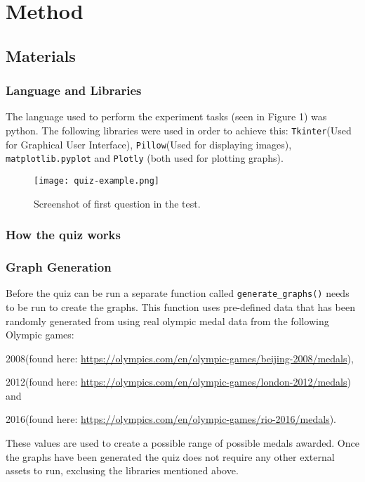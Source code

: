 \section{Method}


\subsection{Materials}
\subsubsection{Language and Libraries}
The language used to perform the experiment tasks (seen in Figure 1) was python. The following libraries were used in order to achieve this:
\verb|Tkinter|(Used for Graphical User Interface), \verb|Pillow|(Used for displaying images), \verb|matplotlib.pyplot| and \verb|Plotly| (both used for plotting graphs).

\begin{figure}[H]
    \centering
    \texttt{[image: quiz-example.png]}
    \caption{Screenshot of first question in the test.}
\end{figure}

\subsubsection{How the quiz works}
\subsubsection*{Graph Generation}
\begin{flushleft}
    Before the quiz can be run a separate function called \verb|generate_graphs()| needs to be run to create the graphs.
    This function uses pre-defined data that has been randomly generated from using real olympic medal data from the following Olympic games:

    2008(found here: \url{https://olympics.com/en/olympic-games/beijing-2008/medals}), 
    
    2012(found here: \url{https://olympics.com/en/olympic-games/london-2012/medals}) and 
    
    2016(found here: \url{https://olympics.com/en/olympic-games/rio-2016/medals}). 
    
    These values are used to create a possible range of possible medals awarded.
    Once the graphs have been generated the quiz does not require any other external assets to run, exclusing the libraries mentioned above.
\end{flushleft}
    

